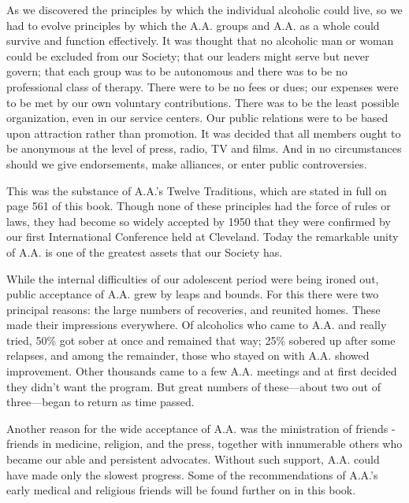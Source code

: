 \begin{biblechapter}
    As we discovered the principles by which 
    the individual alcoholic could live, 
    so we had to evolve principles by which the A.A. groups 
    and A.A. as a whole 
    could survive and function effectively. 
\verse It was thought that no alcoholic man or woman 
    could be excluded from our Society; 
    that our leaders might serve but never govern; 
    that each group was to be autonomous 
    and there was to be no professional class of therapy.
\verse There were to be no fees or dues; 
    our expenses were to be met by our own voluntary contributions.
\verse There was to be the least possible organization, 
    even in our service centers. 
\verse Our public relations were to be based upon attraction 
    rather than promotion. 
\verse It was decided that all members ought to be anonymous 
    at the level of press, radio, TV and films. 
\verse And in no circumstances should we give endorsements, 
    make alliances, 
    or enter public controversies.

    This was the substance of A.A.’s Twelve Traditions, 
    which are stated in full on page 561 of this book.
\verse Though none of these principles had the force of rules or laws, 
    they had become so widely accepted by 1950 
    that they were confirmed by our first 
    International Conference held at Cleveland. 
\verse Today the remarkable unity of A.A. 
    is one of the greatest assets that our Society has.

    While the internal difficulties 
    of our adolescent period were being ironed out, 
    public acceptance of A.A. grew by leaps and bounds.
\verse For this there were two principal reasons: 
    the large numbers of recoveries, 
    and reunited homes.
\verse These made their impressions everywhere.
\verse Of alcoholics who came to A.A. and really tried, 
    50\% got sober at once and remained that way;
    25\% sobered up after some relapses, 
    and among the remainder, 
    those who stayed on with A.A. showed improvement.
\verse Other thousands came to a few A.A. meetings 
    and at first decided they didn’t want the program.
\verse But great numbers of these—about two out of three—began 
    to return as time passed.

    Another reason for the wide acceptance of A.A. 
    was the ministration of friends - 
    friends in medicine, religion, and the press, 
    together with innumerable others 
    who became our able and persistent advocates.
\verse Without such support, 
    A.A. could have made only the slowest progress.
\verse Some of the recommendations of A.A.’s early medical 
    and religious friends 
    will be found further on in this book.


\end{biblechapter}
